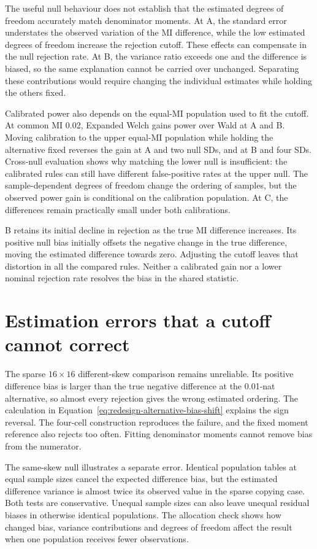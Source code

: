 The useful null behaviour does not establish that the estimated degrees
of freedom accurately match denominator moments. At A, the standard
error understates the observed variation of the MI difference, while
the low estimated degrees of freedom increase the rejection cutoff.
These effects can compensate in the null rejection rate. At B, the
variance ratio exceeds one and the difference is biased, so the same
explanation cannot be carried over unchanged. Separating these
contributions would require changing the individual estimates while
holding the others fixed.

Calibrated power also depends on the equal-MI population used to fit
the cutoff. At common MI 0.02, Expanded Welch gains power over Wald
at A and B. Moving calibration to the upper equal-MI population while
holding the alternative fixed reverses the gain at A and two null SDs,
and at B and four SDs. Cross-null evaluation shows why matching the
lower null is insufficient: the calibrated rules can still have different
false-positive rates at the upper null. The sample-dependent degrees
of freedom change the ordering of samples, but the observed power gain
is conditional on the calibration population. At C, the differences
remain practically small under both calibrations.

B retains its initial decline in rejection as the true MI difference
increases. Its positive null bias initially offsets the negative change
in the true difference, moving the estimated difference towards zero.
Adjusting the cutoff leaves that distortion in all the compared rules.
Neither a calibrated gain nor a lower nominal rejection rate resolves
the bias in the shared statistic.

\section{Estimation errors that a cutoff cannot correct}

The sparse \(16\times16\) different-skew comparison remains unreliable.
Its positive difference bias is larger than the
true negative difference at the 0.01-nat alternative, so almost every
rejection gives the wrong estimated ordering. The calculation in
Equation~\eqref{eq:redesign-alternative-bias-shift} explains the sign
reversal. The four-cell construction reproduces the failure, and the
fixed moment reference also rejects too often. Fitting denominator
moments cannot remove bias from the numerator.

The same-skew null illustrates a separate error. Identical population
tables at equal sample sizes cancel the expected difference bias, but
the estimated difference variance is almost twice its observed value
in the sparse copying case. Both tests are conservative. Unequal
sample sizes can also leave unequal residual biases in otherwise
identical populations. The allocation check shows how changed bias,
variance contributions and degrees of freedom affect the result when
one population receives fewer observations.


